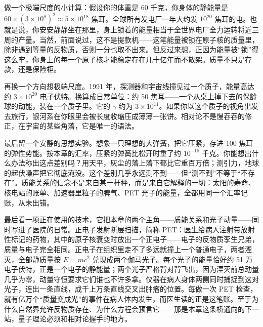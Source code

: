 \begin{thought}[你是一座行走的电站]
做一个极端尺度的小计算：假设你的体重是 60 千克，你身体的静能量是 \(60\times(3\times10^{8})^{2}\approx5\times10^{18}\) 焦耳。全球所有发电厂一年大约发 \(10^{20}\) 焦耳的电。也就是说，你安安静静坐在那里，身上锁着的能量相当于全世界电厂全力运转将近三周的产量。当然，前面说过，这不是提款机——这笔能量被锁在原子核的质量里，除非遇到等量的反物质，否则一分也取不出来。但反过来想，正因为能量被“锁”得这么牢，你身上的每一个原子核才能稳定存在几十亿年而不散架。质量不只是存款，还是保险柜。

再换一个方向想极端尺度。1991 年，探测器和宇宙线撞见过一个质子，能量高达约 \(3\times10^{20}\) 电子伏特。换算成日常单位：约 50 焦耳——一个从桌上掉下去的保龄球的动能，装在一个质子里。它的 \(\gamma\) 约为 \(3\times10^{11}\)。如果你以这个质子的视角出发去旅行，银河系在你眼里会被长度收缩压成薄薄一张饼。相对论不是慢吞吞的修正，在宇宙的某些角落，它是唯一的语法。

最后留一个安静的思想实验。想象一只理想的大弹簧，把它压紧，存进 100 焦耳的弹性势能。按本章的汇率，压紧的弹簧比松开时重了约 \(10^{-15}\) 千克。你能想出什么办法称出这点差别吗？用天平，灰尘的落上落下都比它重百万倍；测引力，地球的起伏噪声把它彻底淹没。这个差别几乎永远测不到——但“测不到”不等于“不存在”。质能关系的信念不是来自某一杆秤，而是来自它解释的一切：太阳的寿命、核电站的账单、加速器里粒子的脾气、PET 光子的能量，全都用同一个汇率记账，从未出错。
\end{thought}

\begin{mainline}
最后看一项正在使用的技术，它把本章的两个主角——质能关系和光子动量——同时写进了医院的日常。正电子发射断层扫描，简称 PET：医生给病人注射带放射性标记的药物，其中的原子核衰变时放出一个正电子——电子的反物质孪生兄弟，质量与电子完全相同。正电子在组织里走不了多远就撞上一个普通电子，两者湮灭，全部静质量按 \(E=mc^{2}\) 兑现成两个伽马光子。每个光子的能量恰好约 51 万电子伏特，正是一个电子的静能量；两个光子严格背对背飞出，因为湮灭前总动量几乎为零，动量守恒要求它们谁也不许多拿。仪器在病人身体两侧同时捕捉到这对光子，连出一条直线，成千上万条直线交叉出肿瘤的位置。每做一次 PET 检查，就有亿万个“质量变成光”的事件在病人体内发生，而医生读的正是这笔账。至于为什么自然界允许反物质存在、为什么方程会预言它——那是本章这条桥通向的下一站，量子理论必须和相对论握手的地方。
\end{mainline}

